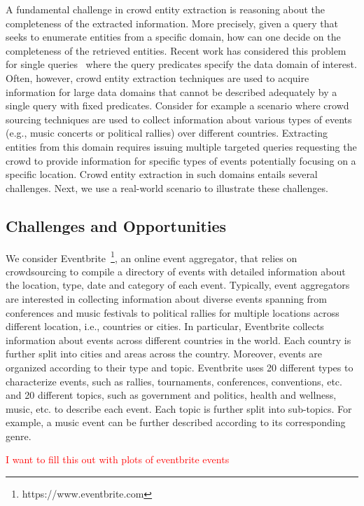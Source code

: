 \documentclass{sig-alternate}
\begin{document}
A fundamental challenge in crowd entity extraction is reasoning about the completeness of the extracted information. More precisely, given a query that seeks to enumerate entities from a specific domain, how can one decide on the completeness of the retrieved entities. Recent work has considered this problem for single queries~\cite{trushkowsky:2013} where the query predicates specify the data domain of interest. Often, however, crowd entity extraction techniques are used to acquire information for large data domains that cannot be described adequately by a single query with fixed predicates. Consider for example a scenario where crowd sourcing techniques are used to collect information about various types of events (e.g., music concerts or political rallies) over different countries. Extracting entities from this domain requires issuing multiple targeted queries requesting the crowd to provide information for specific types of events potentially focusing on a specific location. Crowd entity extraction in such domains entails several challenges. Next, we use a real-world scenario to illustrate these challenges.

\subsection{Challenges and Opportunities}
We consider Eventbrite~\footnote{https://www.eventbrite.com}, an online event aggregator, that relies on crowdsourcing to compile a directory of events with detailed information about the location, type, date and category of each event. Typically, event aggregators are interested in collecting information about diverse events spanning from conferences and music festivals to political rallies for multiple locations across different location, i.e., countries or cities. In particular, Eventbrite collects information about events across different countries in the world. Each country is further split into cities and areas across the country. Moreover, events are organized according to their type and topic. Eventbrite uses 20 different types to characterize events, such as rallies, tournaments, conferences, conventions, etc. and 20 different topics, such as government and politics, health and wellness, music, etc.  to describe each event. Each topic is further split into sub-topics. For example, a  music event can be further described according to its corresponding genre. 

\textcolor{red}{I want to fill this out with plots of eventbrite events}
\end{document}
